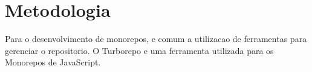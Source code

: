 \section{Metodologia}

Para o desenvolvimento de monorepos, e comum a utilizacao de ferramentas para gerenciar o repositorio. O Turborepo e uma ferramenta utilizada para os Monorepos de JavaScript. 